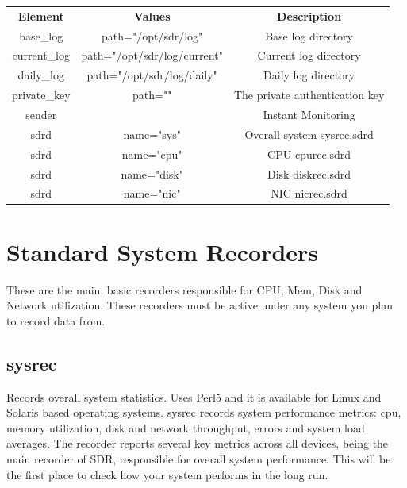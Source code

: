\begin{center}
 \begin{tabular}{ccc}
 \rowcolor{gray!25}
  \textbf{Element} & \textbf{Values} & \textbf{Description} \\
  \small{base\_log}    & \small{path="/opt/sdr/log"}         & \small{Base log directory} \\
  \small{current\_log} & \small{path="/opt/sdr/log/current"} & \small{Current log directory} \\
  \small{daily\_log}   & \small{path="/opt/sdr/log/daily"}   & \small{Daily log directory} \\
  \small{private\_key} & \small{path=""} & \small{The private authentication key} \\
  \small{sender} & ~ & \small{Instant Monitoring} \\
  \small{sdrd} & \small{name="sys"}  & \small{Overall system sysrec.sdrd} \\
  \small{sdrd} & \small{name="cpu"}  & \small{CPU cpurec.sdrd} \\
  \small{sdrd} & \small{name="disk"} & \small{Disk diskrec.sdrd} \\
  \small{sdrd} & \small{name="nic"} & \small{NIC nicrec.sdrd} \\
\end{tabular}
\end{center}


\section{Standard System Recorders}
These are the main, basic recorders responsible for CPU, Mem, Disk
and Network utilization. These recorders must be active under any
system you plan to record data from.



\subsection*{sysrec}
Records overall system statistics. Uses Perl5 and it is available for 
Linux and Solaris based operating systems. sysrec records system 
performance metrics: cpu, memory utilization, disk and network throughput, 
errors and system load averages. The recorder reports several key metrics 
across all devices, being the main recorder of SDR, responsible for 
overall system performance. This  will be the first place to check how your 
system performs in the long run.


